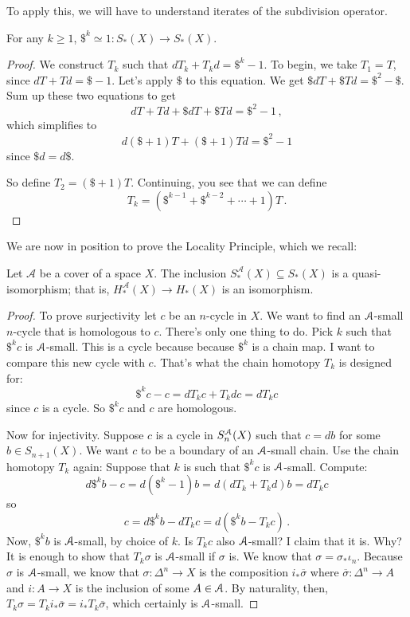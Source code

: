 To apply this, we will have to understand iterates of the subdivision operator.

\begin{lemma} For any $k\geq1$,
$\$^k\simeq 1:S_\ast(X)\to S_\ast(X)$.
\end{lemma}
\begin{proof}
We construct $T_k$ such that $dT_k+T_kd=\$^k-1$. To begin, we take $T_1=T$, since $dT+Td=\$-1$. Let's apply $\$$ to this equation. We get $\$dT+\$Td=\$^2-\$$. Sum up these two equations to get 
\[
dT+Td+\$dT+\$Td = \$^2-1\,,
\] 
which simplifies to 
\[
d(\$+1)T+(\$+1)Td=\$^2-1
\]
since $\$d=d\$$.

So define $T_2=(\$+1)T$. Continuing, you see that we can define
\[
T_k=(\$^{k-1}+\$^{k-2}+\cdots+1)T\,.
\]
\end{proof}

We are now in position to prove the Locality Principle, which we recall:
\begin{theorem}
Let $\mathscr{A}$ be a cover of a space $X$. 
The inclusion $S^\mathscr{A}_\ast(X)\subseteq S_\ast(X)$ is a 
quasi-isomorphism; that is, $H^\mathscr{A}_\ast(X)\to H_\ast(X)$ 
is an isomorphism.
\end{theorem}
\begin{proof}
To prove surjectivity let $c$ be an $n$-cycle in $X$. We want to find an $\mathcal{A}$-small $n$-cycle that is homologous to $c$. There's only one thing to do. Pick $k$ such that $\$^k c$ is $\mathcal{A}$-small. This is a cycle because because $\$^k$ is a chain map. I want to compare this new cycle with $c$. That's what the chain homotopy $T_k$ is designed for: 
\[
\$^kc-c=dT_k c+T_kdc=dT_kc
\]
since $c$ is a cycle. So $\$^kc$ and $c$ are homologous.

Now for injectivity. Suppose $c$ is a cycle in $S^{\mathcal{A}}_n(X)$ such that $c=db$ for some $b\in S_{n+1}(X)$. We want $c$ to be a boundary of an $\mathcal{A}$-small chain. Use the chain homotopy $T_k$ again: Suppose that $k$ is such that $\$^kc$ is $\mathcal{A}$-small. Compute:
\[
d\$^kb-c=d(\$^k-1)b=d(dT_k+T_kd)b=dT_kc
\]
so 
\[
c=d\$^kb-dT_kc=d(\$^kb-T_kc)\,.
\]
Now, $\$^kb$ is $\mathcal{A}$-small, by choice of $k$. Is $T_kc$ also $\mathcal{A}$-small? I claim that it is. Why? It is enough to show that $T_k\sigma$ is $\mathcal{A}$-small if $\sigma$ is. We know that $\sigma=\sigma_\ast\iota_n$. Because $\sigma$ is $\mathcal{A}$-small, we know that $\sigma:\Delta^n\to X$ is the composition $i_\ast\overline{\sigma}$ where $\overline{\sigma}:\Delta^n\to A$ and $i:A\to X$ is the inclusion of some $A\in\mathcal{A}$. By naturality, then, $T_k\sigma=T_ki_\ast\overline{\sigma}=i_\ast T_k\overline{\sigma}$, which certainly is $\mathcal{A}$-small.
\end{proof}

